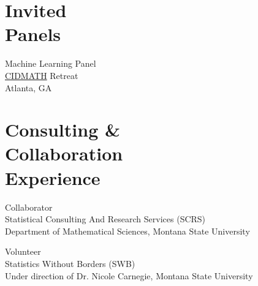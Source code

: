 \documentclass{wm_cv}
\begin{document}
\section{Invited \\ Panels}

Machine Learning Panel \hfill {} \\
    \indent \quad \href{https://www.cidmath.org/}{CIDMATH} Retreat \\
   \indent \quad Atlanta, GA \\







\section{Consulting \& \\ Collaboration \\ Experience}

Collaborator \hfill {} \\ 
    \indent \quad Statistical Consulting And Research Services (SCRS) \\
   \indent \quad Department of Mathematical Sciences, Montana State University

Volunteer \hfill {} \\ 
    \indent \quad Statistics Without Borders (SWB) \\
   \indent \quad Under direction of Dr. Nicole Carnegie, Montana State University
\end{document}
